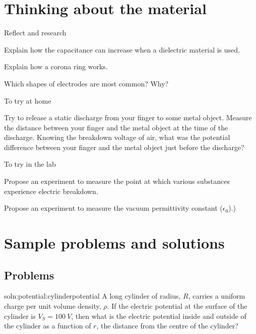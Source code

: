 \newpage
\section{Thinking about the material}

\begin{chapteractivity}{Reflect and research}
{
\item Explain how the capacitance can increase when a dielectric material is used.
\item Explain how a corona ring works.
\item Which shapes of electrodes are most common? Why?
}
\end{chapteractivity}

\begin{chapteractivity}{To try at home}
{
\item Try to release a static discharge from your finger to some metal object. Measure the distance between your finger and the metal object at the time of the discharge. Knowing the breakdown voltage of air, what was the potential difference between your finger and the metal object just before the discharge?
}
\end{chapteractivity}

\begin{chapteractivity}{To try in the lab}
{
\item Propose an experiment to measure the point at which various substances experience electric breakdown.
\item Propose an experiment to measure the vacuum permittivity constant ($\epsilon_0$).)
}
\end{chapteractivity}

\newpage
\section{Sample problems and solutions}

\subsection{Problems}
\begin{problem}{soln:potential:cylinderpotential}{\label{prob:potential:cylinderpotential} 
A long cylinder of radius, $R$, carries a uniform charge per unit volume density, $\rho$. If the electric potential at the surface of the cylinder is $V_S = \SI{100}{V}$, then what is the electric potential inside and outside of the cylinder as a function of $r$, the distance from the centre of the cylinder?}
\end{problem}


